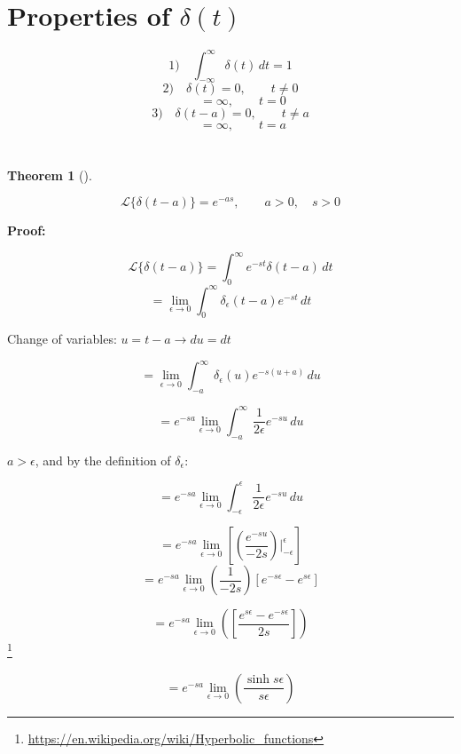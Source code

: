 \documentclass[
  letterpaper,
  DIV=11,
  numbers=noendperiod]{scrreprt}
\theoremstyle{plain}
\newtheorem{theorem}{Theorem}[chapter]
\theoremstyle{remark}
\begin{document}
\section{\texorpdfstring{Properties of
\(\delta(t)\)}{Properties of \textbackslash delta(t)}}\label{properties-of-deltat}

\[1)\quad \int_{-\infty}^{\infty} \delta (t) \,dt = 1\]
\[2)\quad\delta(t)=0,\qquad t\neq 0\] \[\qquad=\infty,\qquad t= 0\]
\[3)\quad\delta(t-a)=0,\qquad t\neq a\] \[\qquad=\infty,\qquad t= a\]

\section{}\label{section-2}

\begin{theorem}[]\protect\hypertarget{thm-deltaa}{}\label{thm-deltaa}

\[\boxed{\mathscr{L}\{\delta(t-a)\}=e^{-as}},\qquad a>0,\quad s>0\]

\end{theorem}

\textbf{Proof:}

\[\mathscr{L}\{\delta(t-a)\}=\int_0^\infty e^{-st}\delta(t-a)\,dt\]
\[=\lim_{\epsilon \rightarrow 0} \int_0^\infty \delta_\epsilon (t-a) e^{-st}\,dt\]

Change of variables: \(u=t-a\rightarrow du=dt\)

\[=\lim_{\epsilon \rightarrow 0} \int_{-a}^\infty \delta_\epsilon (u) e^{-s(u+a)}\,du\]

\[=e^{-sa}\lim_{\epsilon \rightarrow 0} \int_{-a}^\infty \frac{1}{2\epsilon} e^{-su}\,du\]

\(a>\epsilon\), and by the definition of \(\delta_\epsilon\):

\[=e^{-sa}\lim_{\epsilon \rightarrow 0} \int_{-\epsilon}^\epsilon \frac{1}{2\epsilon} e^{-su}\,du\]

\[=e^{-sa}\lim_{\epsilon \rightarrow 0} \left[\left(\frac{e^{-su}}{-2s}\right)\Big|_{-\epsilon}^\epsilon\right]\]
\[=e^{-sa}\lim_{\epsilon \rightarrow 0} \left(\frac{1}{-2s}\right)\left[e^{-s\epsilon} - e^{s\epsilon}\right]\]

\[=e^{-sa}\lim_{\epsilon \rightarrow 0} \left(\left[\frac{e^{s\epsilon} - e^{-s\epsilon}}{2s}\right]\right)\]\footnote{\url{https://en.wikipedia.org/wiki/Hyperbolic_functions}}

\[= e^{-sa}\lim_{\epsilon \rightarrow 0} \left(\frac{\sinh s\epsilon}{s\epsilon}\right)\]
\end{document}
